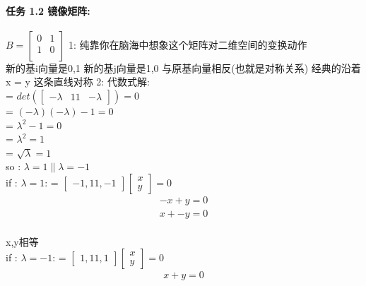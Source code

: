 \documentclass[12pt]{article}
\begin{document}
\paragraph{任务 1.2 镜像矩阵:}
\begin{flushleft}
    $B =  \begin{bmatrix}
            0 & 1 \\
            1 & 0 \\
        \end{bmatrix}$
    1: 纯靠你在脑海中想象这个矩阵对二维空间的变换动作 \\
    新的基i向量是0,1  新的基j向量是1,0 与原基向量相反(也就是对称关系)
    经典的沿着x = y 这条直线对称
    2: 代数式解: \\
    = $det(\begin{bmatrix}
            -\lambda & 1
            1        & -\lambda
        \end{bmatrix}) = 0$ \\
    = $(-\lambda)(-\lambda) - 1 = 0$ \\
    = $\lambda^{2} - 1 = 0$ \\
    = $\lambda^{2} = 1$  \\
    = $\sqrt{\lambda} = 1 $ \\
    so : $\lambda = 1 \| \lambda = -1$ \\
    if : $\lambda = 1 $:
    = $\begin{bmatrix}
            -1 , 1
            1  , -1
        \end{bmatrix}\begin{bmatrix}
            x \\
            y
        \end{bmatrix} = 0$ \\
    \begin{align}
        -x + y = 0 \\
        x + -y = 0
    \end{align} \\
    x,y相等 \\
    if : $\lambda = -1 $:
    = $\begin{bmatrix}
            1 , 1
            1  , 1
        \end{bmatrix}\begin{bmatrix}
            x \\
            y
        \end{bmatrix} = 0$ \\
    \begin{align}
        x + y = 0 \\

\end{align}
\end{flushleft}
\end{document}
